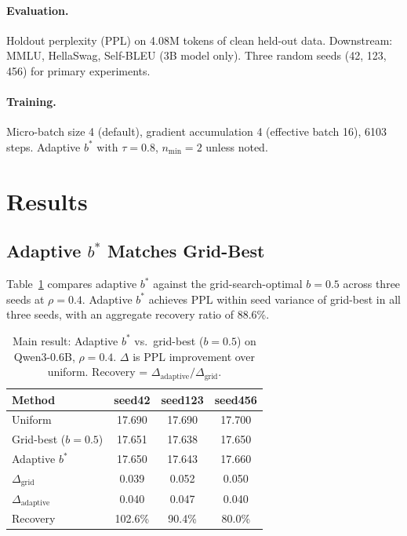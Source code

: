 \documentclass[11pt,a4paper]{article}
\newcommand{\bstar}{b^{*}}
\newcommand{\nmin}{n_{\min}}
\begin{document}
\paragraph{Evaluation.}
Holdout perplexity (PPL) on 4.08M tokens of clean held-out data.
Downstream: MMLU, HellaSwag, Self-BLEU (3B model only).
Three random seeds (42, 123, 456) for primary experiments.

\paragraph{Training.}
Micro-batch size 4 (default), gradient accumulation 4 (effective batch 16), 6103 steps.
Adaptive $\bstar$ with $\tau = 0.8$, $\nmin = 2$ unless noted.


\section{Results}
\label{sec:results}

\subsection{Adaptive $\bstar$ Matches Grid-Best}
\label{sec:main_result}

Table~\ref{tab:main} compares adaptive $\bstar$ against the grid-search-optimal $b = 0.5$ across three seeds at $\rho = 0.4$.
Adaptive $\bstar$ achieves PPL within seed variance of grid-best in all three seeds, with an aggregate recovery ratio of 88.6\%.

\begin{table}[t]
\centering
\small
\caption{Main result: Adaptive $\bstar$ vs.\ grid-best ($b{=}0.5$) on Qwen3-0.6B, $\rho{=}0.4$. $\Delta$ is PPL improvement over uniform. Recovery = $\Delta_{\text{adaptive}}/\Delta_{\text{grid}}$.}
\label{tab:main}
\begin{tabular}{lccc}
\toprule
\textbf{Method} & \textbf{seed42} & \textbf{seed123} & \textbf{seed456} \\
\midrule
Uniform          & 17.690 & 17.690 & 17.700 \\
Grid-best ($b{=}0.5$) & 17.651 & 17.638 & 17.650 \\
Adaptive $\bstar$     & 17.650 & 17.643 & 17.660 \\
\midrule
$\Delta_{\text{grid}}$     & 0.039 & 0.052 & 0.050 \\
$\Delta_{\text{adaptive}}$ & 0.040 & 0.047 & 0.040 \\
Recovery              & 102.6\% & 90.4\% & 80.0\% \\
\bottomrule
\end{tabular}
\end{table}
\end{document}
